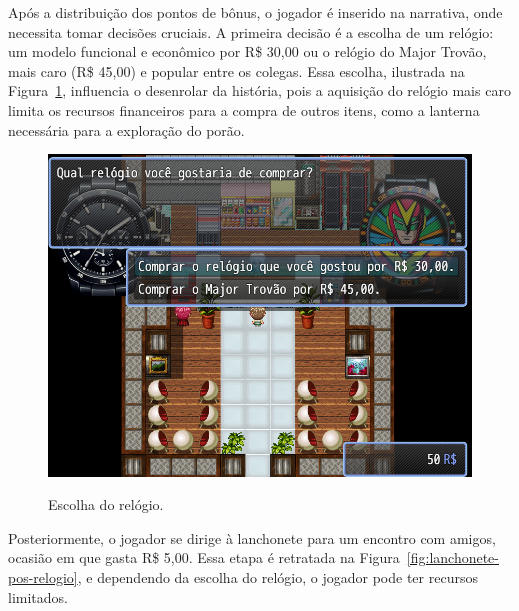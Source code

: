 Após a distribuição dos pontos de bônus, o jogador é inserido na narrativa, onde necessita tomar decisões cruciais. A primeira decisão é a escolha de um relógio: um modelo funcional e econômico por R\$ 30,00 ou o relógio do Major Trovão, mais caro (R\$ 45,00) e popular entre os colegas. Essa escolha, ilustrada na Figura~\ref{fig:escolha-relogio}, influencia o desenrolar da história, pois a aquisição do relógio mais caro limita os recursos financeiros para a compra de outros itens, como a lanterna necessária para a exploração do porão.

\begin{figure}[!htbp]
	\centering
	\caption{Escolha do relógio.}
	\includegraphics[scale=0.5]{Textuais/Pictures/escolha-relogio.png}
	\label{fig:escolha-relogio}
\end{figure}

Posteriormente, o jogador se dirige à lanchonete para um encontro com amigos, ocasião em que gasta R\$ 5,00. Essa etapa é retratada na Figura~\ref{fig:lanchonete-pos-relogio}, e dependendo da escolha do relógio, o jogador pode ter recursos limitados.%

